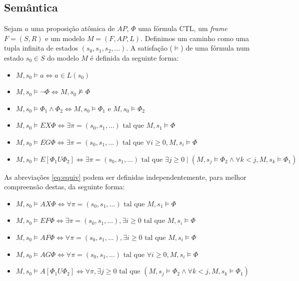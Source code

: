\documentclass[cic,tc]{infufrgs}
\begin{document}
	\subsection{Semântica}
	\label{sec:ctl_semantica}
	Sejam $a$ uma proposição atômica de $AP$, $\Phi$ uma fórmula CTL, um \textit{frame} $F = (S,R)$ e um modelo $M = (F, AP, L)$. Definimos um caminho como uma tupla infinita de estados $(s_0,s_1,s_2,...)$. A satisfação ($\models$) de uma fórmula num estado $s_0\in S$ do modelo $M$ é definida da seguinte forma:
	\begin{itemize}
		\item $M, s_0 \models a \iff a \in L(s_0)$
		\item $M, s_0 \models \neg \Phi \iff M, s_0 \not\models \Phi$
		\item $M, s_0 \models \Phi_1 \land \Phi_2 \iff M, s_0 \models \Phi_1 \text{ e } M, s_0 \models \Phi_2$
		\item $M, s_0 \models EX \Phi \iff \exists \pi = (s_0, s_1, \dots) \text{ tal que } M, s_1 \models \Phi$
		\item $M, s_0 \models EG \Phi \iff \exists \pi = (s_0, s_1, \dots) \text{ tal que } \forall i \geq 0, M, s_i \models \Phi$
		\item $M, s_0 \models E[\Phi_1 U \Phi_2] \iff \exists \pi = (s_0, s_1, \dots) \text{ tal que } \exists j \geq 0 \mid (M, s_j \models \Phi_2 \land \forall k < j, M, s_k \models \Phi_1)$
	\end{itemize}
	As abreviações \eqref{eq:equiv} podem ser definidas independentemente, para melhor compreensão destas, da seguinte forma:
	\begin{itemize}
		\item  $M, s_0 \models AX \Phi \iff \forall \pi = (s_0, s_1, \dots) \text{ tal que } M, s_1 \models \Phi$
		\item  $M, s_0 \models EF \Phi \iff \exists \pi = (s_0, s_1, \dots), \exists i \ge 0 \text{ tal que } M, s_i \models \Phi$
		\item  $M, s_0 \models AF \Phi \iff \forall \pi = (s_0, s_1, \dots), \exists i \ge 0 \text{ tal que } M, s_i \models \Phi$
		\item  $M, s_0 \models AG \Phi \iff \forall \pi = (s_0, s_1, \dots) \text{ tal que } \forall i \ge 0, M, s_i \models \Phi$
		\item  $M, s_0 \models A[\Phi_1 U \Phi_2] \iff \forall \pi, \exists j \ge 0 \text{ tal que } (M, s_j \models \Phi_2 \land \forall k < j, M, s_k \models \Phi_1)$
	\end{itemize}
	
\end{document}
